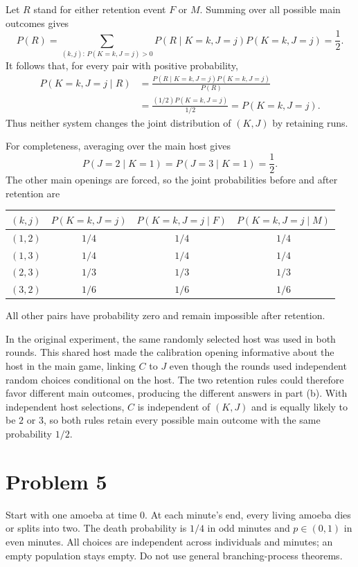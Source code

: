 \documentclass[11pt,a4paper]{article}
\newcommand{\Prob}{P}
\begin{document}
\begin{enumerate}
Let $R$ stand for either retention event $F$ or $M$. Summing over all
possible main outcomes gives
\[
\Prob(R)=\sum_{(k,j):\,\Prob(K=k,J=j)>0}
\Prob(R\mid K=k,J=j)\Prob(K=k,J=j)=\frac12.
\]
It follows that, for every pair with positive probability,
\begin{align*}
\Prob(K=k,J=j\mid R)
&=\frac{\Prob(R\mid K=k,J=j)\Prob(K=k,J=j)}{\Prob(R)}\\
&=\frac{(1/2)\Prob(K=k,J=j)}{1/2}
=\Prob(K=k,J=j).
\end{align*}
Thus neither system changes the joint distribution of $(K,J)$ by
retaining runs.

For completeness, averaging over the main host gives
\[
\Prob(J=2\mid K=1)=\Prob(J=3\mid K=1)=\frac12.
\]
The other main openings are forced, so the joint probabilities before
and after retention are
\begin{center}
\begin{tabular}{cccc}
\toprule
$(k,j)$ & $\Prob(K=k,J=j)$ & $\Prob(K=k,J=j\mid F)$
& $\Prob(K=k,J=j\mid M)$\\\midrule
$(1,2)$ & $1/4$ & $1/4$ & $1/4$\\
$(1,3)$ & $1/4$ & $1/4$ & $1/4$\\
$(2,3)$ & $1/3$ & $1/3$ & $1/3$\\
$(3,2)$ & $1/6$ & $1/6$ & $1/6$\\\bottomrule
\end{tabular}
\end{center}
All other pairs have probability zero and remain impossible after
retention.

In the original experiment, the same randomly selected host was used in
both rounds. This shared host made the calibration opening informative
about the host in the main game, linking $C$ to $J$ even though the
rounds used independent random choices conditional on the host.
The two retention rules could therefore favor different main outcomes,
producing the different answers in part (b). With independent host
selections, $C$ is independent of $(K,J)$ and is equally likely to be
$2$ or $3$, so both rules retain every possible main outcome with the
same probability $1/2$.
\end{enumerate}

\clearpage
\section*{Problem 5}
Start with one amoeba at time $0$. At each minute's end, every living
amoeba dies or splits into two. The death probability is $1/4$ in odd
minutes and $p\in(0,1)$ in even minutes. All choices are independent
across individuals and minutes; an empty population stays empty.
Do not use general branching-process theorems.
\end{document}
